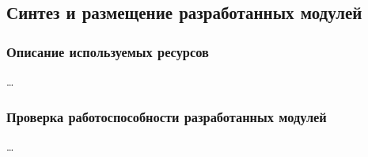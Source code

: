 \subsection{Синтез и размещение разработанных модулей}

\subsubsection{Описание используемых ресурсов}

\dots

\subsubsection{Проверка работоспособности разработанных модулей}

\dots